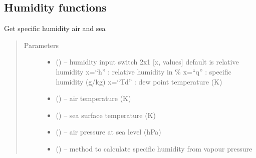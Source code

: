 \documentclass[letterpaper,10pt,english]{sphinxmanual}
\begin{document}
\subsection{Humidity functions}

\label{\detokenize{index:humidity-functions}}
\label{\detokenize{index:module-hum_subs}}

\begin{fulllineitems}
\label{\detokenize{index:hum_subs.get_hum}}
Get specific humidity air and sea

\begin{quote}\begin{description}
\item[{Parameters}] \leavevmode\begin{itemize}
\item {} 
 (\href{https://docs.python.org/3/library/functions.html\#array}{}) -- humidity input switch 2x1 [x, values] default is relative humidity
            x=``h'' : relative humidity in \%
            x=``q'' : specific humidity (g/kg)
            x=``Td'' : dew point temperature (K)

\item {} 
 (\href{https://docs.python.org/3/library/functions.html\#float}{}) -- air temperature  (K)

\item {} 
 (\href{https://docs.python.org/3/library/functions.html\#float}{}) -- sea surface temperature (K)

\item {} 
 (\href{https://docs.python.org/3/library/functions.html\#float}{}) -- air pressure at sea level (hPa)

\item {} 
 (\href{https://docs.python.org/3/library/functions.html\#str}{}) -- method to calculate specific humidity from vapour pressure
\end{itemize}


\end{description}
\end{quote}
\end{fulllineitems}
\end{document}
